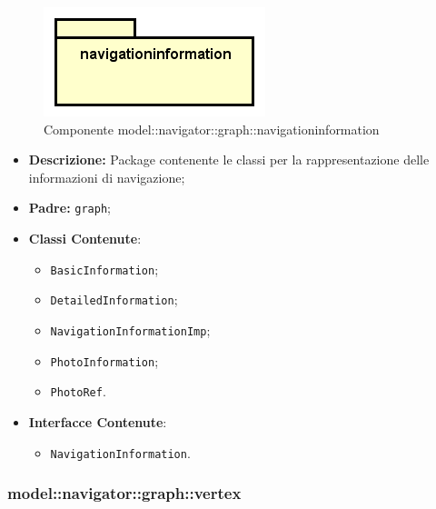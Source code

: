 \documentclass[../DefinizioneDiProdotto.tex]{subfiles}
\begin{document}
    \begin{figure}[H]
        \centering
        \includegraphics{img/package/navigationinformation.png}
        \caption{Componente model::\-navigator::\-graph::\-navigationinformation}\label{fig:model::navigator::graph::navigationinformation} 
    \end{figure}
    \begin{itemize}
\item \textbf{Descrizione:} Package contenente le classi per la rappresentazione delle informazioni di navigazione;
\item \textbf{Padre:} \texttt{graph};
\item \textbf{Classi Contenute}:
\begin{itemize}
\item \texttt{BasicInformation};

\item \texttt{DetailedInformation};

\item \texttt{NavigationInformationImp};

\item \texttt{PhotoInformation};

\item \texttt{PhotoRef}.

\end{itemize}
\item \textbf{Interfacce Contenute}:
\begin{itemize}
\item \texttt{NavigationInformation}.

\end{itemize}
\end{itemize}

\subsubsection{model::\-navigator::\-graph::\-vertex}
\end{document}
